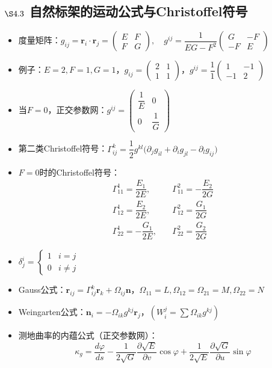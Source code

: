 \documentclass{article}
\begin{document}
	\subsection{$\S4.3$ 自然标架的运动公式与Christoffel符号}
	\begin{itemize}
		\item 度量矩阵：$g_{ij}=\boldsymbol{r}_i\cdot\boldsymbol{r}_j=\begin{pmatrix}E&F\\F&G\end{pmatrix},\quad g^{ij}=\dfrac{1}{EG-F^2}\begin{pmatrix}G&-F\\-F&E\end{pmatrix}$
		\item 例子：$E=2,F=1,G=1$，$g_{ij}=\begin{pmatrix}2&1\\1&1\end{pmatrix}$，$g^{ij}=\dfrac{1}{1}\begin{pmatrix}1&-1\\-1&2\end{pmatrix}$
		\item 当$F=0$，正交参数网：$g^{ij}=\begin{pmatrix}\dfrac{1}{E}&0\\0&\dfrac{1}{G}\end{pmatrix}$
		\item 第二类Christoffel符号：$\Gamma^k_{ij}=\dfrac{1}{2}g^{kl}\big(\partial_jg_{il}+\partial_ig_{jl}-\partial_lg_{ij}\big)$
		\item $F=0$时的Christoffel符号：
		\[
		\begin{aligned}
			\Gamma_{11}^1=\dfrac{E_1}{2E},\quad&\Gamma_{11}^2=-\dfrac{E_2}{2G}\\
			\Gamma_{12}^1=\dfrac{E_2}{2E},\quad&\Gamma_{12}^2=\dfrac{G_1}{2G}\\
			\Gamma_{22}^1=-\dfrac{G_1}{2E},\quad&\Gamma_{22}^2=\dfrac{G_2}{2G}
		\end{aligned}
		\]
		\item $\delta_j^i=\begin{cases}1&i=j\\0&i\neq j\end{cases}$
		\item Gauss公式：$\boldsymbol{r}_{ij}=\Gamma^k_{ij}\boldsymbol{r}_k+\Omega_{ij}\boldsymbol{n}$，$\Omega_{11}=L,\Omega_{12}=\Omega_{21}=M,\Omega_{22}=N$
		\item Weingarten公式：$\boldsymbol{n}_i=-\Omega_{ik}g^{kj}\boldsymbol{r}_j$，$(W_i^j=\sum\Omega_{ik}g^{kj})$
		\item 测地曲率的内蕴公式（正交参数网）：
		\[
		\kappa_g=\dfrac{d\varphi}{ds}-\dfrac{1}{2\sqrt{G}}\dfrac{\partial\sqrt{E}}{\partial v}\cos\varphi+\dfrac{1}{2\sqrt{E}}\dfrac{\partial\sqrt{G}}{\partial u}\sin\varphi
		\]
	\end{itemize}
	
\end{document}
